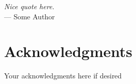 
\begin{flushright}{\slshape
		Nice quote here.} \\ \medskip
	--- Some Author
\end{flushright}



\bigskip

\begingroup
\let\clearpage\relax
\let\cleardoublepage\relax
\let\cleardoublepage\relax
\chapter*{Acknowledgments}

Your acknowledgments here if desired

\endgroup
